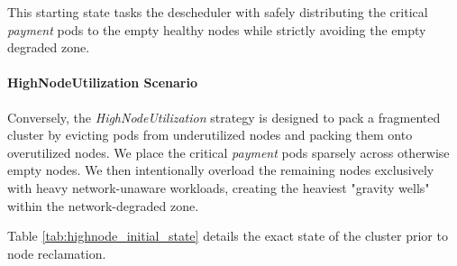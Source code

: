This starting state tasks the descheduler with safely distributing the critical \textit{payment} pods to the empty healthy nodes while strictly avoiding the empty degraded zone.

\paragraph{HighNodeUtilization Scenario}
\label{subsubsec:netaware4_workload_highnode}
Conversely, the \textit{HighNodeUtilization} strategy is designed to pack a fragmented cluster by evicting pods from underutilized nodes and packing them onto overutilized nodes. We place the critical \textit{payment} pods sparsely across otherwise empty nodes. We then intentionally overload the remaining nodes exclusively with heavy network-unaware workloads, creating the heaviest "gravity wells" within the network-degraded zone.

Table \ref{tab:highnode_initial_state} details the exact state of the cluster prior to node reclamation.

\begin{table}[tbp]
    \centering
    \caption{Resource Allocation: Initial State for HighNodeUtilization Strategy}
    \label{tab:highnode_initial_state}
\end{table}

